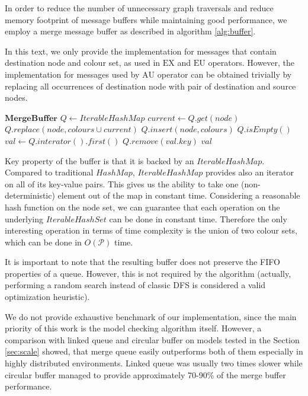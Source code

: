 \documentclass[12pt,oneside]{fithesis2}
\newcommand{\params}{\mathcal{P}}
\newcommand{\eu}[2]{\ensuremath{\mbox{E} #1 \mbox{U} #2 }}
\newcommand{\au}[2]{\ensuremath{\mbox{A} #1 \mbox{U} #2 }}
\newcommand{\ex}[1]{\ensuremath{\mbox{EX} #1}}
\begin{document}
			In order to reduce the number of unnecessary graph traversals and reduce memory footprint of message buffers while maintaining good performance, we employ a merge message buffer as described in algorithm \ref{alg:buffer}. 
			
			In this text, we only provide the implementation for messages that contain destination node and colour set, as used in $\ex{}$ and $\eu{}{}$ operators. However, the implementation for messages used by $\au{}{}$ operator can be obtained trivially by replacing all occurrences of destination node with pair of destination and source nodes.
			
			\begin{algorithm}
			\label{alg:buffer}
			\begin{algorithmic}[1]
			\State $ \textbf{MergeBuffer} $
			\State $ Q \gets IterableHashMap $
					\State $current \gets Q.get(node)$
					\State $Q.replace(node, colours \cup current)$
				\Else
					\State $Q.insert(node, colours)$				
				\EndIf
			\EndProcedure
				\State \Return $Q.isEmpty()$
			\EndProcedure
				\State $val \gets Q.interator().first()$
				\State $Q.remove(val.key)$
				\State \Return $val$
			\EndProcedure
			\end{algorithmic}				
			\end{algorithm}
			
			Key property of the buffer is that it is backed by an $IterableHashMap$. Compared to traditional $HashMap$, $IterableHashMap$ provides also an iterator on all of its key-value pairs. This gives us the ability to take one (non-deterministic) element out of the map in constant time. Considering a reasonable hash function on the node set, we can guarantee that each operation on the underlying $IterableHashSet$ can be done in constant time. Therefore the only interesting operation in terms of time complexity is the union of two colour sets, which can be done in $O(\params)$ time.
			
			It is important to note that the resulting buffer does not preserve the FIFO properties of a queue. However, this is not required by the algorithm (actually, performing a random search instead of classic DFS is considered a valid optimization heuristic).
			
			We do not provide exhaustive benchmark of our implementation, since the main priority of this work is the model checking algorithm itself. However, a comparison with linked queue and circular buffer on models tested in the Section \ref{sec:scale} showed, that merge queue easily outperforms both of them especially in highly distributed environments. Linked queue was usually two times slower while circular buffer managed to provide approximately 70-90\% of the merge buffer performance. 
			
\end{document}
